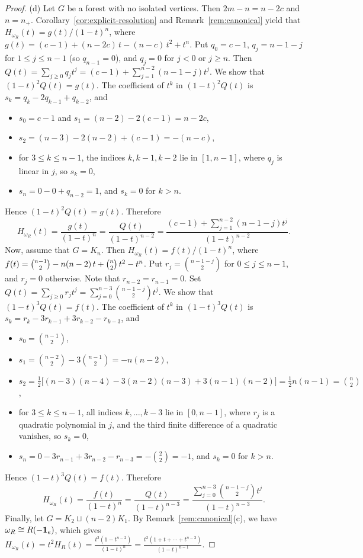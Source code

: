 \documentclass[12pt]{amsart}
\begin{document}
\begin{proof}
(d) Let $G$ be a forest with no isolated vertices. Then $2m-n=n-2c$ and $n=n_+$. Corollary~\ref{cor:explicit-resolution} and Remark~\ref{rem:canonical} yield that
$H_{\omega_R}(t)=g(t)/(1-t)^n$, where 
$g(t)=(c-1)+(n-2c)\,t-(n-c)\,t^{2}+t^{n}$.
	Put $q_0=c-1$, $q_j=n-1-j$ for $1\le j\le n-1$ (so $q_{n-1}=0$), and $q_j=0$ for $j<0$ or $j\ge n$. Then $Q(t)=\sum_{j\ge0}q_jt^j=(c-1)+\sum_{j=1}^{n-2}(n-1-j)t^j$. We show that  $(1-t)^2Q(t)=g(t)$. The coefficient of $t^k$ in $(1-t)^2Q(t)$ is $s_k=q_k-2q_{k-1}+q_{k-2}$, and
	\begin{itemize}
		\item $s_0=c-1$ and $s_1=(n-2)-2(c-1)=n-2c$,
		\item $s_2=(n-3)-2(n-2)+(c-1)=-(n-c)$,
		\item for $3\le k\le n-1$, the indices $k,k-1,k-2$ lie in $[1,n-1]$, where $q_j$ is linear in $j$, so $s_k=0$,
		\item $s_n=0-0+q_{n-2}=1$, and $s_k=0$ for $k>n$.
	\end{itemize}
	Hence $(1-t)^2Q(t)=g(t)$. Therefore
	\[
	H_{\omega_R}(t)=\frac{g(t)}{(1-t)^n}=\frac{Q(t)}{(1-t)^{n-2}}=\frac{(c-1)+\sum_{j=1}^{n-2}(n-1-j)t^j}{(1-t)^{n-2}}.
	\]
Now, assume that $G=K_n$. Then $H_{\omega_R}(t)=f(t)/(1-t)^n$, where 
$f(t)=\tbinom{n-1}{2}-n(n-2)\,t+\tbinom n2\,t^{2}-t^{n}$.	
	Put $r_j=\binom{n-1-j}{2}$ for $0\le j\le n-1$, and $r_j=0$ otherwise. Note that $r_{n-2}=r_{n-1}=0$. Set $Q(t)=\sum_{j\ge0}r_jt^j=\sum_{j=0}^{n-3}\binom{n-1-j}{2}t^j$. We show that $(1-t)^3Q(t)=f(t)$. The coefficient of $t^k$ in $(1-t)^3Q(t)$ is $s_k=r_k-3r_{k-1}+3r_{k-2}-r_{k-3}$, and 
	\begin{itemize}
		\item $s_0=\binom{n-1}{2}$,
		\item $s_1=\binom{n-2}{2}-3\binom{n-1}{2}=-n(n-2)$,
		\item $s_2=\tfrac12\big[(n-3)(n-4)-3(n-2)(n-3)+3(n-1)(n-2)\big]=\tfrac12 n(n-1)=\binom n2$,
		\item for $3\le k\le n-1$, all indices $k,\dots,k-3$ lie in $[0,n-1]$, where $r_j$ is a quadratic polynomial in $j$, and the third finite difference of a quadratic vanishes, so $s_k=0$,
		\item $s_n=0-3r_{n-1}+3r_{n-2}-r_{n-3}=-\binom22=-1$, and $s_k=0$ for $k>n$.
	\end{itemize}
	Hence $(1-t)^3Q(t)=f(t)$. Therefore
	\[
	H_{\omega_R}(t)=\frac{f(t)}{(1-t)^n}=\frac{Q(t)}{(1-t)^{n-3}}=\frac{\sum_{j=0}^{n-3}\binom{n-1-j}{2}t^j}{(1-t)^{n-3}}. 
	\]
    Finally, let $G=K_2\sqcup (n-2)K_1$. By Remark~\ref{rem:canonical}(c), we have $\omega_R\cong R(-{\bf 1}_{e})$, which gives $H_{\omega_R}(t)=t^2H_{R}(t)=\frac{t^2(1-t^{n-2})}{(1-t)^n}=\frac{t^2(1+t+\cdots+t^{n-3})}{(1-t)^{n-1}}.$ 
\smallskip


\end{proof}
\end{document}
